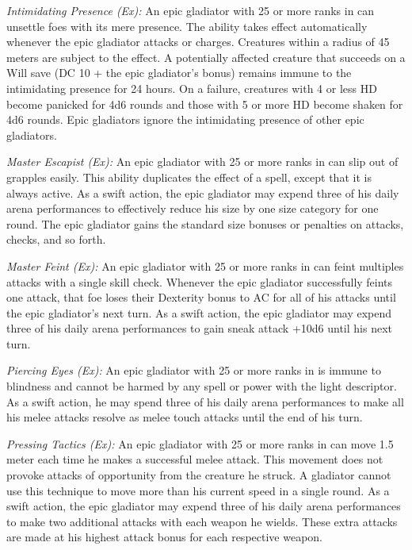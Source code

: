 \textit{Intimidating Presence (Ex):} An epic gladiator with 25 or more ranks in  can unsettle foes with its mere presence. The ability takes effect automatically whenever the epic gladiator attacks or charges. Creatures within a radius of 45 meters are subject to the effect. A potentially affected creature that succeeds on a Will save (DC 10 + the epic gladiator's  bonus) remains immune to the intimidating presence for 24 hours. On a failure, creatures with 4 or less HD become panicked for 4d6 rounds and those with 5 or more HD become shaken for 4d6 rounds. Epic gladiators ignore the intimidating presence of other epic gladiators.

\textit{Master Escapist (Ex):} An epic gladiator with 25 or more ranks in  can slip out of grapples easily. This ability duplicates the effect of a  spell, except that it is always active. As a swift action, the epic gladiator may expend three of his daily arena performances to effectively reduce his size by one size category for one round. The epic gladiator gains the standard size bonuses or penalties on attacks,  checks, and so forth.

\textit{Master Feint (Ex):} An epic gladiator with 25 or more ranks in  can feint multiples attacks with a single skill check. Whenever the epic gladiator successfully feints one attack, that foe loses their Dexterity bonus to AC for all of his attacks until the epic gladiator's next turn. As a swift action, the epic gladiator may expend three of his daily arena performances to gain sneak attack +10d6 until his next turn.

\textit{Piercing Eyes (Ex):} An epic gladiator with 25 or more ranks in  is immune to blindness and cannot be harmed by any spell or power with the light descriptor. As a swift action, he may spend three of his daily arena performances to make all his melee attacks resolve as melee touch attacks until the end of his turn.

\textit{Pressing Tactics (Ex):} An epic gladiator with 25 or more ranks in  can move 1.5 meter each time he makes a successful melee attack. This movement does not provoke attacks of opportunity from the creature he struck. A gladiator cannot use this technique to move more than his current speed in a single round. As a swift action, the epic gladiator may expend three of his daily arena performances to make two additional attacks with each weapon he wields. These extra attacks are made at his highest attack bonus for each respective weapon.

